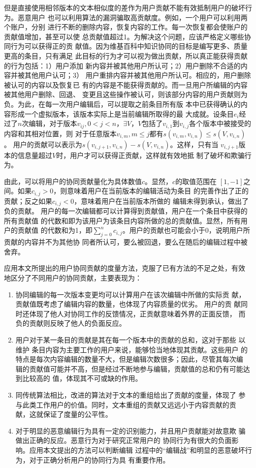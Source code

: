 但是直接使用相邻版本的文本相似度的差作为用户贡献不能有效抵制用户的破坏行为。恶意用户
也可以利用算法的漏洞骗取高贡献度。例如，一个用户可以利用两个账户，分别
进行不断的删除内容，恢复内容的工作。每一次恢复都会使账户的贡献值增加，甚至可以使
总贡献值超过1。为解决这个问题，应该严格定义哪些协同行为可以获得正的贡
献值。因为维基百科中知识协同的目标是编写更多、质量更高的条目，只有满足
此目标的行为才可以视为做出贡献，所以真正能获得贡献的行为包括：1）用户添加
新内容并被其他用户所认可；2）用户删除不合适的内容并被其他用户认可；3）
用户重排内容并被其他用户所认可。相应的，用户删除被认可的内容以及恢复已
有的内容是不能获得贡献的。而一旦用户所编辑的内容被其他用户删除、回退、
变更且这些操作被认可，则该部分内容的用户贡献则为负。为此，在每一次用户编辑后，可以提取之前条目所有版
本中已获得确认的内容形成一个虚拟版本，该版本实际上是当前编辑所取得的最
大成就。设条目$e_i$经过了$n$次编辑，对于版本$v_{ij}, 0<j<n$，$\exists
V$，$V$包括了$v_{i,1}$到$v_{i,j}$各个版本中被接受的内容和其相对位置，则
对于任意版本$v_{i,m},m \leq j$都有$s(v_{i,m},v_{i,n}) \leq s(V,v_{i,n})$。
用户的贡献可以表示为$s(v_{i,j+1},v_{i,n})-s(V,v_{i,n})$。这样，只有当
$v_{i,j+1}$版本的信息量超过$V$时，用户才可以获得正贡献，这样就有效地抵
制了破坏和欺骗行为。

由此，可以将用户的协同贡献量化为具体数值$c$。显然，$c$的取值范围在
$[1,-1]$之间。如果$c_{i,j}>0$，则意味着用户在当前版本的编辑活动为条目
的完善作出了正的贡献；反之如果$c_{i,j}<0$，意味着用户在当前版本所做的
编辑未得到承认，做出了负的贡献。
用户的每一次编辑都可以计算得到贡献值，用户在一个条目中获得的所有贡献值
的代数和即为该用户为该条目内容所做的总的贡献值。显然，所有用户的贡献值
的代数和为1，即$\sum_{j=0}^{n}c_{i,j}$。用户的贡献也可能会小于0，说明用户所贡献的内容并不为其他协
同者所认可，要么被回退，要么在随后的编辑过程中被舍弃。

应用本文所提出的用户协同贡献的度量方法，克服了已有方法的不足之处，有效
地区分了不同用户的协同贡献，主要表现为：
\begin{enumerate}
\item 协同编辑的每一次版本变更均可以计算用户在该次编辑中所做的实际贡
  献，贡献值既考虑了编辑内容的数量，也体现了内容质量的优劣。 用户的贡
  献同时还体现了他人对协同工作的反馈情况，正贡献意味着外界的正面反馈，
  而负的贡献则反映了他人的负面反应。
\item 用户对于某一条目的贡献是其在每一个版本中的贡献的总和，这对于那些
  以维护 条目内容为主要工作的用户来说，能够恰当地体现其贡献。这些用户
  的特点是每次内容编辑的数量不大，但是编辑次数很多；因此，尽管其每次编
  辑的贡献值可能并不高，但是经过不断地参与编辑，贡献值的总和仍有可能达到比较高的
  值，体现其不可或缺的作用。
\item 同传统算法相比，改进的算法对于文本的重组给出了贡献的度量，体现了
  参与此类工作用户的价值。同时，文本重组的贡献又远远小于内容贡献的贡
  献，这就保证了度量的公平性。
\item 对于明显的恶意编辑行为具有一定的识别能力，并且用户贡献能对故意欺
  骗做出正确的反应。恶意行为对于研究正常用户的
  协同行为有很大的负面影响。应用本文提出的方法可以判断编辑
  过程中的“编辑战”和明显的恶意破坏行为，对于正确分析用户的协同行为具
  有重要作用。
\end{enumerate}
 
